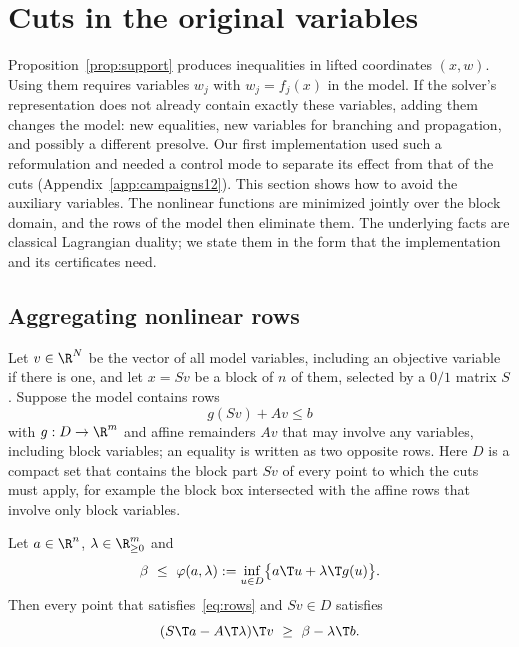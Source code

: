 \section{Cuts in the original variables}\label{sec:original}

Proposition~\ref{prop:support} produces inequalities in lifted coordinates
$(x,w)$. Using them requires variables $w_j$ with $w_j=f_j(x)$ in the model.
If the solver's representation does not already contain exactly these
variables, adding them changes the model: new equalities, new variables for
branching and propagation, and possibly a different presolve. Our first
implementation used such a reformulation and needed a control mode to
separate its effect from that of the cuts (Appendix~\ref{app:campaigns12}).
This section shows how to avoid the auxiliary variables. The nonlinear
functions are minimized jointly over the block domain, and the rows of the
model then eliminate them. The underlying facts are classical Lagrangian
duality; we state them in the form that the implementation and its
certificates need.

\subsection{Aggregating nonlinear rows}\label{sec:aggregation}

Let $v\in\R^N$ be the vector of all model variables, including an objective
variable if there is one, and let $x=Sv$ be a block of $n$ of them, selected
by a $0/1$ matrix $S$. Suppose the model contains rows
\begin{equation}\label{eq:rows}
g(Sv)+Av\le b
\end{equation}
with $g:D\to\R^m$ and affine remainders $Av$ that may involve any variables,
including block variables; an equality is written as two opposite rows. Here
$D$ is a compact set that contains the block part $Sv$ of every point to
which the cuts must apply, for example the block box intersected with the
affine rows that involve only block variables.

\begin{proposition}\label{prop:aggregate}
Let $a\in\R^n$, $\lambda\in\R^m_{\ge0}$ and
\begin{equation}\label{eq:agg-support}
\beta\ \le\ \varphi(a,\lambda):=\inf_{u\in D}\bigl\{a\T u+\lambda\T g(u)\bigr\}.
\end{equation}
Then every point that satisfies~\eqref{eq:rows} and $Sv\in D$ satisfies
\begin{equation}\label{eq:agg-cut}
(S\T a-A\T\lambda)\T v\ \ge\ \beta-\lambda\T b .
\end{equation}
\end{proposition}

